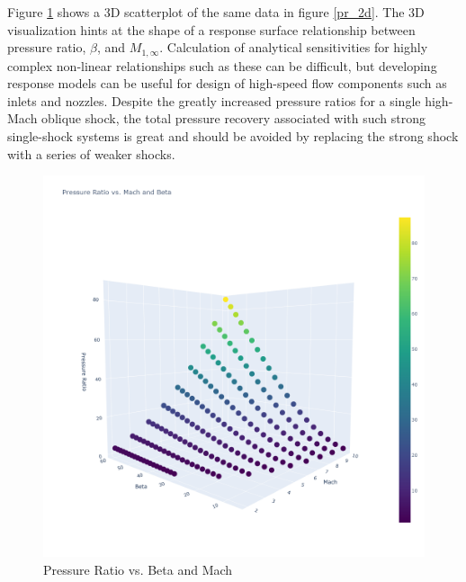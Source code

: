 \documentclass[../main.tex]{subfiles}
\begin{document}
Figure \ref{3d_scatter} shows a 3D scatterplot of the same data in figure \ref{pr_2d}.
The 3D visualization hints at the shape of a response surface relationship between pressure ratio, \(\beta\), and \(M_{1,\infty}\).
Calculation of analytical sensitivities for highly complex non-linear relationships such as these can be difficult, but developing response models can be useful for design of high-speed flow components such as inlets and nozzles.
Despite the greatly increased pressure ratios for a single high-Mach oblique shock, the total pressure recovery associated with such strong single-shock systems is great and should be avoided by replacing the strong shock with a series of weaker shocks.

\begin{figure}[h!]
    \centering
    \includegraphics[scale=0.5]{../../images/problem_1/scatter_3d.png}
    \caption{Pressure Ratio vs. Beta and Mach}
    \label{3d_scatter}
\end{figure}
\end{document}
